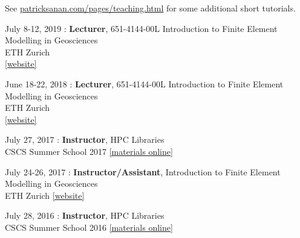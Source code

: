 
\begin{samepage}
See \href{https://patricksanan.com/pages/teaching.html}{patricksanan.com/pages/teaching.html}
for some additional short tutorials. \\
\end{samepage}

\begin{samepage}
\noindent July 8-12, 2019 : \textbf{Lecturer}, 651-4144-00L Introduction to Finite Element Modelling in Geosciences \\
ETH Zurich\\
\href{http://jupiter.ethz.ch/~gfdteaching/femblockcourse/2019/}{[website]}\\
\end{samepage}

\begin{samepage}
\noindent June 18-22, 2018 : \textbf{Lecturer}, 651-4144-00L Introduction to Finite Element Modelling in Geosciences \\
ETH Zurich\\
\href{http://jupiter.ethz.ch/~gfdteaching/femblockcourse/2018/}{[website]}\\
\end{samepage}

\begin{samepage}
\noindent July 27, 2017 : \textbf{Instructor}, HPC Libraries \\
CSCS Summer School 2017
\href{https://github.com/eth-cscs/SummerSchool2017}{[materials online]}\\
\end{samepage}

\begin{samepage}
\noindent July 24-26, 2017 : \textbf{Instructor/Assistant}, Introduction to Finite Element Modelling in Geosciences \\
ETH Zurich
\href{https://jupiter2.ethz.ch/~gfdteaching/femblockcourse/2017/}{[website]}\\
\end{samepage}

\begin{samepage}
\noindent July 28, 2016 : \textbf{Instructor}, HPC Libraries \\
CSCS Summer School 2016
\href{https://github.com/eth-cscs/SummerSchool2016}{[materials online]}\\
\end{samepage}

